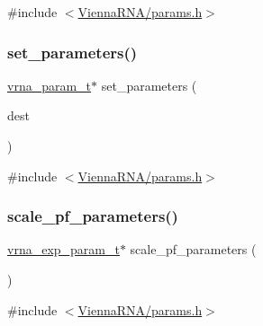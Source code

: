 {\ttfamily \#include $<$\mbox{\hyperlink{params_8h}{Vienna\+R\+N\+A/params.\+h}}$>$}

\mbox{\label{group__energy__parameters_gac5889dd7be0201c76ebdd1c501cdff54}} 
\subsubsection{\texorpdfstring{set\+\_\+parameters()}{set\_parameters()}}
{\footnotesize\ttfamily \mbox{\hyperlink{group__energy__parameters_ga8a69ca7d787e4fd6079914f5343a1f35}{vrna\+\_\+param\+\_\+t}}$\ast$ set\+\_\+parameters (\begin{DoxyParamCaption}\item[{\mbox{\hyperlink{group__energy__parameters_ga8a69ca7d787e4fd6079914f5343a1f35}{vrna\+\_\+param\+\_\+t}} $\ast$}]{dest }\end{DoxyParamCaption})}



{\ttfamily \#include $<$\mbox{\hyperlink{params_8h}{Vienna\+R\+N\+A/params.\+h}}$>$}

\mbox{\label{group__energy__parameters_ga32414ddbb3ff0aa35d18ad8e002aad5a}} 
\subsubsection{\texorpdfstring{scale\+\_\+pf\+\_\+parameters()}{scale\_pf\_parameters()}}
{\footnotesize\ttfamily \mbox{\hyperlink{group__energy__parameters_ga01d8b92fe734df8d79a6169482c7d8d8}{vrna\+\_\+exp\+\_\+param\+\_\+t}}$\ast$ scale\+\_\+pf\+\_\+parameters (\begin{DoxyParamCaption}\item[{void}]{ }\end{DoxyParamCaption})}



{\ttfamily \#include $<$\mbox{\hyperlink{params_8h}{Vienna\+R\+N\+A/params.\+h}}$>$}

\mbox{\label{group__energy__parameters_ga00bcbd1e68465def3dabc12c213372cb}} 
